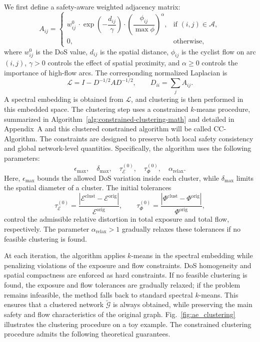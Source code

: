 \documentclass[lettersize,journal]{IEEEtran}
\begin{document}
We first define a safety-aware weighted adjacency matrix:
\begin{equation}
\label{eq:adjacency_matrix}
A_{ij} =
\begin{cases}
w_{ij}^{0}\,\cdot \exp\!\left(-\dfrac{d_{ij}}{\gamma}\right)\cdot 
\left(\dfrac{\phi_{ij}}{\max \phi}\right)^{\alpha},
& \text{if } (i,j)\in\mathcal{A},\\[0.6em]
0, & \text{otherwise},
\end{cases}
\end{equation}
where $w_{ij}^{0}$ is the DoS value, $d_{ij}$ is the spatial distance, $\phi_{ij}$ is the cyclist flow on arc $(i,j)$, $\gamma>0$ controls the effect of spatial proximity, and $\alpha\geq0$ controls the importance of high-flow arcs. The corresponding normalized Laplacian is
\begin{equation}
\label{eq:modified_laplacian}
  \mathcal{L}=I-D^{-1/2}AD^{-1/2},
  \qquad
  D_{ii}=\sum_j A_{ij}.    
\end{equation}
A spectral embedding is obtained from $\mathcal{L}$, and clustering is then performed in this embedded space. The clustering step uses a constrained $k$-means procedure, summarized in Algorithm~\ref{alg:constrained-clustering-math} and detailed in Appendix~A and this clustered constrained algorithm will be called CC-Algorithm. The constraints are designed to preserve both local safety consistency and global network-level quantities. Specifically, the algorithm uses the following parameters:
\[
\epsilon_{\max},\quad
\delta_{\max},\quad
\tau_{\mathcal{E}}^{(0)},\quad
\tau_{\Phi}^{(0)},\quad
\alpha_{\mathrm{relax}}.
\]
Here, $\epsilon_{\max}$ bounds the allowed DoS variation inside each cluster, while $\delta_{\max}$ limits the spatial diameter of a cluster. The initial tolerances
\[
\tau_{\mathcal{E}}^{(0)}
=
\frac{\left|\mathcal{E}^{\mathrm{clust}}-\mathcal{E}^{\mathrm{orig}}\right|}
{\mathcal{E}^{\mathrm{orig}}},
\qquad
\tau_{\Phi}^{(0)}
=
\frac{\left|\Phi^{\mathrm{clust}}-\Phi^{\mathrm{orig}}\right|}
{\Phi^{\mathrm{orig}}},
\]
control the admissible relative distortion in total exposure and total flow, respectively. The parameter $\alpha_{\mathrm{relax}}>1$ gradually relaxes these tolerances if no feasible clustering is found.

At each iteration, the algorithm applies $k$-means in the spectral embedding
while penalizing violations of the exposure and flow constraints. DoS
homogeneity and spatial compactness are enforced as hard constraints. If no
feasible clustering is found, the exposure and flow tolerances are gradually
relaxed; if the problem remains infeasible, the method falls back to standard
spectral $k$-means. This ensures that a clustered network
$\tilde{\mathcal{G}}$ is always obtained, while preserving the main safety and
flow characteristics of the original graph. Fig.~\ref{fig:ae_clustering}
illustrates the clustering procedure on a toy example. The constrained clustering procedure admits the following theoretical guarantees.
\end{document}
